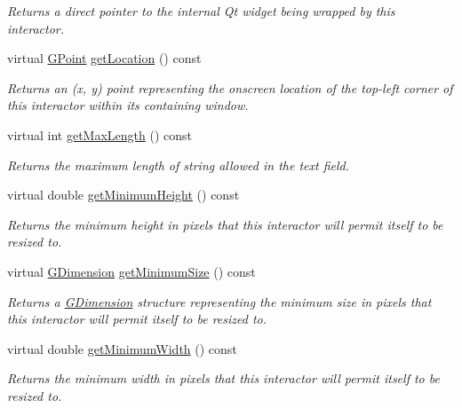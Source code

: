 \begin{DoxyCompactItemize}
\begin{DoxyCompactList}\small\item\em Returns a direct pointer to the internal Qt widget being wrapped by this interactor. \end{DoxyCompactList}\item 
virtual \mbox{\hyperlink{structsgl_1_1GPoint}{G\+Point}} \mbox{\hyperlink{classsgl_1_1GInteractor_a4f83802015511edeb63b892830812c11}{get\+Location}} () const
\begin{DoxyCompactList}\small\item\em Returns an (x, y) point representing the onscreen location of the top-\/left corner of this interactor within its containing window. \end{DoxyCompactList}\item 
virtual int \mbox{\hyperlink{classsgl_1_1GTextField_a465e41b66da9e75443bf0b7951582468}{get\+Max\+Length}} () const
\begin{DoxyCompactList}\small\item\em Returns the maximum length of string allowed in the text field. \end{DoxyCompactList}\item 
virtual double \mbox{\hyperlink{classsgl_1_1GInteractor_aed4b0075fcc434499c3cb3e46896bda3}{get\+Minimum\+Height}} () const
\begin{DoxyCompactList}\small\item\em Returns the minimum height in pixels that this interactor will permit itself to be resized to. \end{DoxyCompactList}\item 
virtual \mbox{\hyperlink{structsgl_1_1GDimension}{G\+Dimension}} \mbox{\hyperlink{classsgl_1_1GInteractor_a66b5af0b32493b4d597ca0a3df2049ea}{get\+Minimum\+Size}} () const
\begin{DoxyCompactList}\small\item\em Returns a \mbox{\hyperlink{structsgl_1_1GDimension}{G\+Dimension}} structure representing the minimum size in pixels that this interactor will permit itself to be resized to. \end{DoxyCompactList}\item 
virtual double \mbox{\hyperlink{classsgl_1_1GInteractor_a59e668114fe3d49d2a0f28deb258f7c8}{get\+Minimum\+Width}} () const
\begin{DoxyCompactList}\small\item\em Returns the minimum width in pixels that this interactor will permit itself to be resized to. \end{DoxyCompactList}\item 

\end{DoxyCompactItemize}
